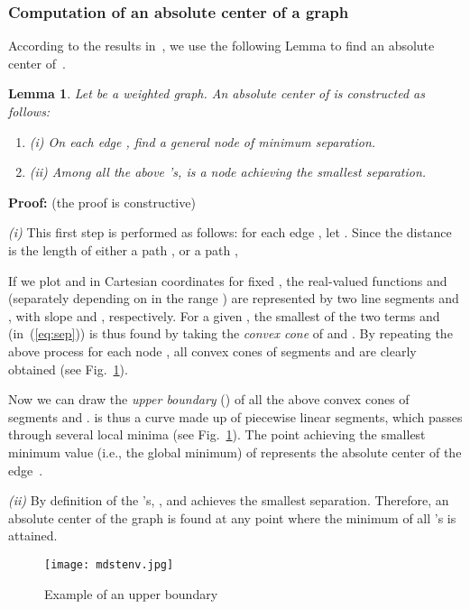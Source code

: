 \documentclass[10pt]{article}
\newcommand{\be}{\begin{enumerate}}
\newcommand{\ee}{\end{enumerate}}
\newtheorem{lemm}{Lemma}[section]
\newenvironment{proof}{\begin{trivlist}
                       \item[]\hspace{0cm}\textbf{Proof: }
                       \hspace{0cm} }{\hfill 
                       \end{trivlist}}
\begin{document}
\subsubsection{Computation of an absolute center of a graph} \label{center}\hfill

\noindent
According to the results in~\cite{Chri75}, we use the following Lemma
to find an absolute center of~.

\begin{lemm}\label{lem:hackimi}
Let  be a weighted graph. An absolute center 
of  is constructed as follows:

\vspace{-0.9\baselineskip}
\be
\item[(i)] On each edge , find a general node 
of minimum separation.
\item[(ii)] Among all the above 's,  is a node
achieving the smallest separation.
\ee
\end{lemm}

\begin{proof}(the proof is constructive)

{\em (i)} This first step is performed as follows: for each edge , let
. Since the distance  is the length
of either a path , or a path ,


If we plot  and  in Cartesian coordinates for fixed , the
real-valued functions  and 
(separately depending on  in the range ) are
represented by two line segments  and ,
with slope  and , respectively. For a given , the
smallest of the two terms  and 
(in~(\ref{eq:sep})) is thus found by taking the {\em convex cone} of
 and . By repeating the above process for
each node , all convex cones of segments 
and  are clearly obtained (see
Fig.~\ref{fig:bound}).

Now we can draw the {\em upper boundary}  () of all the above convex cones of segments  and .  is thus a curve made up
of piecewise linear segments, which passes through several local
minima (see Fig.~\ref{fig:bound}). The point  achieving the
smallest minimum value (i.e., the global minimum) of 
represents the absolute center  of the edge~.

\medskip
{\em (ii)} By definition of the 's, , and  achieves the
smallest separation. Therefore, an absolute center of the graph is found
at any point where the minimum of all 's is attained.
\end{proof}

\begin{figure}[htb]
\centering
\texttt{[image: mdstenv.jpg]}
\caption{Example of an upper boundary }
\label{fig:bound}
\end{figure}
\end{document}
